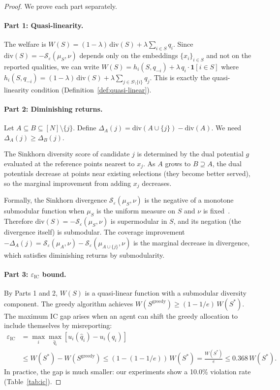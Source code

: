 \documentclass[10pt]{article}
\begin{document}
\begin{proof}
We prove each part separately.

\paragraph{Part 1: Quasi-linearity.}
The welfare is $W(S) = (1-\lambda)\,\mathrm{div}(S) + \lambda\sum_{i \in S} q_i$.
Since $\mathrm{div}(S) = -\mathcal{S}_\varepsilon(\mu_S, \nu)$ depends only on the embeddings $\{x_i\}_{i \in S}$ and not on the reported qualities, we can write
$W(S) = h_i(S, q_{-i}) + \lambda\, q_i \cdot \mathbf{1}[i \in S]$
where $h_i(S, q_{-i}) = (1-\lambda)\,\mathrm{div}(S) + \lambda\sum_{j \in S \setminus \{i\}} q_j$.
This is exactly the quasi-linearity condition (Definition~\ref{def:quasi-linear}).

\paragraph{Part 2: Diminishing returns.}
Let $A \subseteq B \subseteq [N] \setminus \{j\}$.
Define $\Delta_A(j) = \mathrm{div}(A \cup \{j\}) - \mathrm{div}(A)$.
We need $\Delta_A(j) \geq \Delta_B(j)$.

The Sinkhorn diversity score of candidate $j$ is determined by the dual potential $g$ evaluated at the reference points nearest to $x_j$.
As $A$ grows to $B \supseteq A$, the dual potentials decrease at points near existing selections (they become better served), so the marginal improvement from adding $x_j$ decreases.

Formally, the Sinkhorn divergence $\mathcal{S}_\varepsilon(\mu_S, \nu)$ is the negative of a monotone submodular function when $\mu_S$ is the uniform measure on $S$ and $\nu$ is fixed~\citep{feydy2019interpolating}.
Therefore $\mathrm{div}(S) = -\mathcal{S}_\varepsilon(\mu_S, \nu)$ is supermodular in $S$, and its negation (the divergence itself) is submodular.
The coverage improvement $-\Delta_A(j) = \mathcal{S}_\varepsilon(\mu_A, \nu) - \mathcal{S}_\varepsilon(\mu_{A \cup \{j\}}, \nu)$ is the marginal decrease in divergence, which satisfies diminishing returns by submodularity.

\paragraph{Part 3: $\varepsilon_{\mathrm{IC}}$ bound.}
By Parts 1 and 2, $W(S)$ is a quasi-linear function with a submodular diversity component.
The greedy algorithm achieves $W(S^{\mathrm{greedy}}) \geq (1-1/e)\, W(S^*)$.
The maximum IC gap arises when an agent can shift the greedy allocation to include themselves by misreporting:
\begin{align}
\varepsilon_{\mathrm{IC}} &= \max_i \max_{\hat{q}_i} [u_i(\hat{q}_i) - u_i(q_i)] \\
&\leq W(S^*) - W(S^{\mathrm{greedy}}) \leq (1 - (1-1/e))\, W(S^*) = \frac{W(S^*)}{e} \leq 0.368\, W(S^*).
\end{align}
In practice, the gap is much smaller: our experiments show a 10.0\% violation rate (Table~\ref{tab:ic}).
\end{proof}
\end{document}
